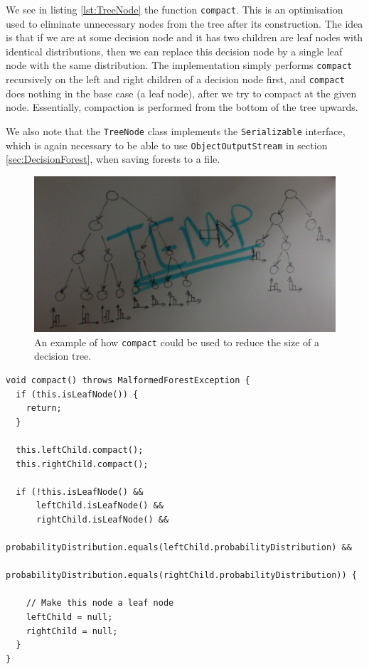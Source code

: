 \documentclass[12pt,twoside,notitlepage]{report}
\begin{document}
                We see in listing \ref{lst:TreeNode} the function \texttt{compact}. This is an optimisation 
                used to eliminate unnecessary nodes from the tree after its construction. The idea is that if we are at 
                some decision node and it has two children are leaf nodes with identical distributions, then we 
                can replace this decision node by a single leaf node with the same distribution. The implementation 
                simply performs \texttt{compact} recursively on the left and right children of a decision node first, 
                and \texttt{compact} does nothing in the base case (a leaf node), after we try to compact at the 
                given node. Essentially, compaction is performed from the bottom of the tree upwards.

                We also note that the \texttt{TreeNode} class implements the \texttt{Serializable} interface, 
                which is again necessary to be able to use \texttt{ObjectOutputStream} in section 
                \ref{sec:DecisionForest}, when saving forests to a file.

                \begin{figure}[H]
                  \centering
                  \includegraphics[scale=0.35]{tree_compaction.jpeg}
                  \caption{An example of how \texttt{compact} could be used to reduce the size of a decision tree.}
                \end{figure}

                \begin{lstlisting}[caption={The \texttt{TreeNode} declaration, found as a static class within the 
                \texttt{DecisionForest} class.},label={lst:TreeNode}]
void compact() throws MalformedForestException {
  if (this.isLeafNode()) {
    return;
  }
  
  this.leftChild.compact();
  this.rightChild.compact();

  if (!this.isLeafNode() && 
      leftChild.isLeafNode() &&
      rightChild.isLeafNode() &&
      probabilityDistribution.equals(leftChild.probabilityDistribution) &&
      probabilityDistribution.equals(rightChild.probabilityDistribution)) {
    
    // Make this node a leaf node
    leftChild = null;
    rightChild = null;
  }
}
                \end{lstlisting}
\end{document}
